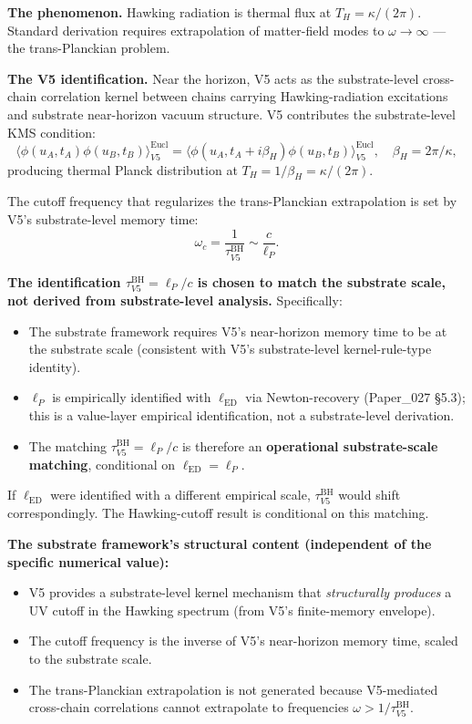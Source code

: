 \documentclass[11pt,a4paper]{article}
\begin{document}
\textbf{The phenomenon.} Hawking radiation is thermal flux at $T_H = \kappa/(2\pi)$. Standard derivation requires extrapolation of matter-field modes to $\omega \to \infty$ --- the trans-Planckian problem.

\textbf{The V5 identification.} Near the horizon, V5 acts as the substrate-level cross-chain correlation kernel between chains carrying Hawking-radiation excitations and substrate near-horizon vacuum structure. V5 contributes the substrate-level KMS condition:
\[
\langle\phi(u_A, t_A)\phi(u_B, t_B)\rangle_{V5}^\mathrm{Eucl} = \langle\phi(u_A, t_A + i\beta_H)\phi(u_B, t_B)\rangle_{V5}^\mathrm{Eucl}, \quad \beta_H = 2\pi/\kappa,
\]
producing thermal Planck distribution at $T_H = 1/\beta_H = \kappa/(2\pi)$.

The cutoff frequency that regularizes the trans-Planckian extrapolation is set by V5's substrate-level memory time:
\[
\omega_c = \frac{1}{\tau_{V5}^\mathrm{BH}} \sim \frac{c}{\ell_P}.
\]

\textbf{The identification $\tau_{V5}^\mathrm{BH} = \ell_P/c$ is chosen to match the substrate scale, not derived from substrate-level analysis.} Specifically:

\begin{itemize}[noitemsep]
\item The substrate framework requires V5's near-horizon memory time to be at the substrate scale (consistent with V5's substrate-level kernel-rule-type identity).
\item $\ell_P$ is empirically identified with $\ell_\mathrm{ED}$ via Newton-recovery (Paper\_027 \S5.3); this is a value-layer empirical identification, not a substrate-level derivation.
\item The matching $\tau_{V5}^\mathrm{BH} = \ell_P/c$ is therefore an \textbf{operational substrate-scale matching}, conditional on $\ell_\mathrm{ED} = \ell_P$.
\end{itemize}

If $\ell_\mathrm{ED}$ were identified with a different empirical scale, $\tau_{V5}^\mathrm{BH}$ would shift correspondingly. The Hawking-cutoff result is conditional on this matching.

\textbf{The substrate framework's structural content (independent of the specific numerical value):}

\begin{itemize}[noitemsep]
\item V5 provides a substrate-level kernel mechanism that \emph{structurally produces} a UV cutoff in the Hawking spectrum (from V5's finite-memory envelope).
\item The cutoff frequency is the inverse of V5's near-horizon memory time, scaled to the substrate scale.
\item The trans-Planckian extrapolation is not generated because V5-mediated cross-chain correlations cannot extrapolate to frequencies $\omega > 1/\tau_{V5}^\mathrm{BH}$.
\end{itemize}
\end{document}
